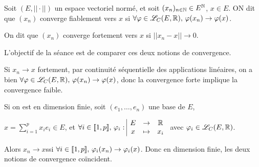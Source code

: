 Soit $(E, ||\cdot||)$ un espace vectoriel normé, et soit $(x_n)_{n\in\mathbb{N}} \in E^{\mathbb{N}}$, 
$x \in E$. ON dit que $(x_n)$ converge fiablement vers $x$ si 
$\forall \varphi \in \mathscr L_C(E, \mathbb{R}), \, \varphi(x_n) \to \varphi(x)$.

On dit que $(x_n)$ converge fortement vers $x$ si $||x_n - x|| \to 0$.

L'objectif de la séance est de comparer ces deux notions de convergence.

\begin{remarque}
    Si $x_n \to x$ fortement, par continuité séquentielle des applications linéaires, 
    on a bien $\forall \varphi \in \mathscr L_C(E, \mathbb{R}), \, \varphi(x_n) \to \varphi(x)$,
    donc la convergence forte implique la convergence faible.
\end{remarque}

\begin{remarque}
    Si on est en dimension finie, soit $(e_1, \ldots, e_n)$ une base de $E$, 

    $\displaystyle x = \sum_{i = 1 }^{p } x_i e_i \in E$, et
    $\forall i \in [\![1, p]\!], \, \varphi_i: \space \begin{array}{|ccc} \displaystyle E & \to & \displaystyle \mathbb{R} \\ \displaystyle x & \mapsto & \displaystyle x_i \end{array}$ avec $\varphi_i \in \mathscr L_C(E, \mathbb{R})$.

    Alors $x_n \to x $ssi $\forall i \in [\![1, p]\!], \, \varphi_i(x_n) \to \varphi_i(x)$. 
    Donc en dimension finie, les deux notions de convergence coïncident.
\end{remarque}
    
